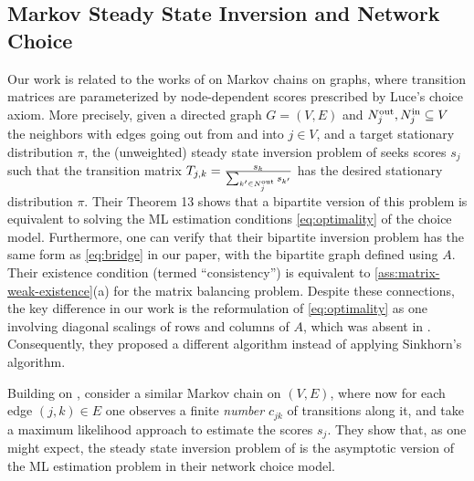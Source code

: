 \subsection{Markov Steady State Inversion and Network Choice}
\label{subsec:steady-state}
Our work is related to the works of \citet{kumar2015inverting,maystre2017choicerank} on Markov chains on graphs, where transition matrices are parameterized by node-dependent scores prescribed by Luce's choice axiom. More precisely, given a directed graph $G=(V,E)$ and $N^{\text{out}}_j, N^{\text{in}}_j \subseteq V$ the neighbors with edges going out from and into $j\in V$, and a target stationary distribution $\pi$, the (unweighted) steady state inversion problem of \citet{kumar2015inverting} seeks scores $s_j$ such that the transition matrix $T_{j,k}=\frac{s_k}{\sum_{k'\in N^{\text{out}}_j}s_{k'}}$ has the desired stationary distribution $\pi$. Their Theorem 13 shows that a bipartite version of this problem is equivalent to solving the ML estimation conditions \eqref{eq:optimality} of the choice model. Furthermore, one can verify that their bipartite inversion problem has the same form as \eqref{eq:bridge} in our paper, with the bipartite graph defined using $A$. Their existence condition (termed ``consistency'') is equivalent to \cref{ass:matrix-weak-existence}(a) \citep{menon1968matrix} for the matrix balancing problem. Despite these connections, the key difference in our work is the reformulation of \eqref{eq:optimality} as one involving diagonal scalings of rows and columns of $A$, which was absent in \citet{kumar2015inverting}. Consequently, they proposed a different algorithm instead of applying Sinkhorn's algorithm. 

Building on \citet{kumar2015inverting}, \citet{maystre2017choicerank} consider a similar Markov chain on $(V,E)$, where now for each edge $(j,k) \in E$ one observes a finite \emph{number} $c_{jk}$ of transitions along it, and take a maximum likelihood approach to estimate the scores $s_j$.  They show that, as one might expect, the steady state inversion problem of \citet{kumar2015inverting} is the asymptotic version of the ML estimation problem in their network choice model. 

